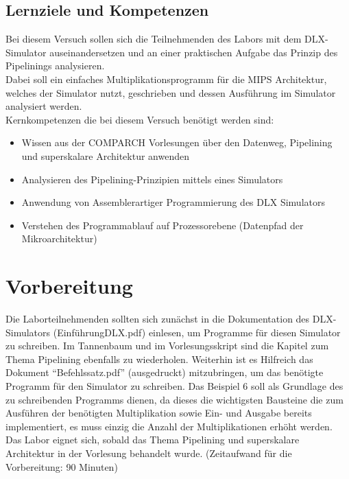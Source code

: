 \documentclass[a4paper,ngerman]{scrartcl}
\begin{document}
\subsection{Lernziele und Kompetenzen}
\label{kompetenzen}
Bei diesem Versuch sollen sich die Teilnehmenden des Labors mit dem DLX-Simulator auseinandersetzen und an einer praktischen Aufgabe das Prinzip des Pipelinings analysieren. \\
Dabei soll ein einfaches Multiplikationsprogramm für die MIPS Architektur, welches der Simulator nutzt, geschrieben und dessen Ausführung im Simulator analysiert werden. \\
Kernkompetenzen die bei diesem Versuch benötigt werden sind:

\begin{itemize}
    \item Wissen aus der COMPARCH Vorlesungen über den Datenweg, Pipelining und superskalare Architektur anwenden
    \item Analysieren des Pipelining-Prinzipien mittels eines Simulators
    \item Anwendung von Assemblerartiger Programmierung des DLX Simulators
    \item Verstehen des Programmablauf auf Prozessorebene (Datenpfad der Mikroarchitektur)
\end{itemize}

\section{Vorbereitung}
Die Laborteilnehmenden sollten sich zunächst in die Dokumentation des DLX-Simulators (EinführungDLX.pdf) einlesen, um Programme für diesen Simulator zu schreiben.
Im Tannenbaum und im Vorlesungsskript sind die Kapitel zum Thema Pipelining ebenfalls zu wiederholen.
Weiterhin ist es Hilfreich das Dokument \enquote{Befehlssatz.pdf} (ausgedruckt) mitzubringen, um das benötigte Programm für den Simulator zu schreiben.
Das Beispiel 6 soll als Grundlage des zu schreibenden Programms dienen, da dieses die wichtigsten Bausteine die zum Ausführen der benötigten Multiplikation sowie Ein- und Ausgabe bereits implementiert, es muss einzig die Anzahl der Multiplikationen erhöht werden. 
Das Labor eignet sich, sobald das Thema Pipelining und superskalare Architektur in der Vorlesung behandelt wurde.
\newline (Zeitaufwand für die Vorbereitung: 90 Minuten)
\end{document}
